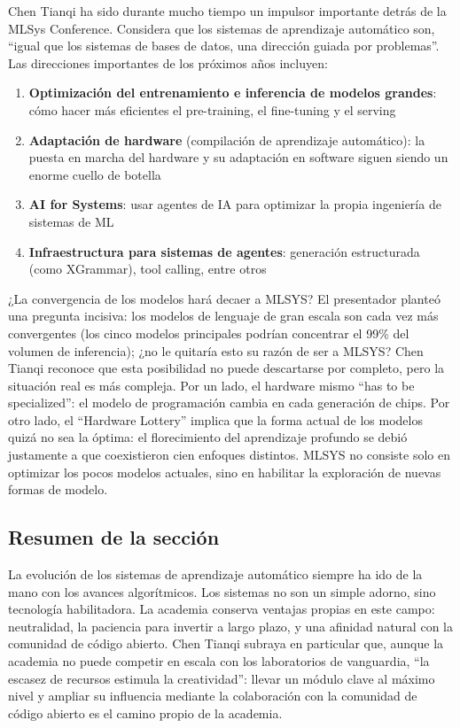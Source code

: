 \documentclass[a4paper]{article}
\begin{document}
Chen Tianqi ha sido durante mucho tiempo un impulsor importante detrás de la MLSys Conference. Considera que los sistemas de aprendizaje automático son, ``igual que los sistemas de bases de datos, una dirección guiada por problemas''. Las direcciones importantes de los próximos años incluyen:

\begin{enumerate}
    \item \textbf{Optimización del entrenamiento e inferencia de modelos grandes}: cómo hacer más eficientes el pre-training, el fine-tuning y el serving
    \item \textbf{Adaptación de hardware} (compilación de aprendizaje automático): la puesta en marcha del hardware y su adaptación en software siguen siendo un enorme cuello de botella
    \item \textbf{AI for Systems}: usar agentes de IA para optimizar la propia ingeniería de sistemas de ML
    \item \textbf{Infraestructura para sistemas de agentes}: generación estructurada (como XGrammar), tool calling, entre otros
\end{enumerate}

\begin{knowledgebox}{¿La convergencia de los modelos hará decaer a MLSYS?}
El presentador planteó una pregunta incisiva: los modelos de lenguaje de gran escala son cada vez más convergentes (los cinco modelos principales podrían concentrar el 99\% del volumen de inferencia); ¿no le quitaría esto su razón de ser a MLSYS? Chen Tianqi reconoce que esta posibilidad no puede descartarse por completo, pero la situación real es más compleja. Por un lado, el hardware mismo ``has to be specialized'': el modelo de programación cambia en cada generación de chips. Por otro lado, el ``Hardware Lottery'' implica que la forma actual de los modelos quizá no sea la óptima: el florecimiento del aprendizaje profundo se debió justamente a que coexistieron cien enfoques distintos. MLSYS no consiste solo en optimizar los pocos modelos actuales, sino en habilitar la exploración de nuevas formas de modelo.
\end{knowledgebox}

\subsection{Resumen de la sección}

La evolución de los sistemas de aprendizaje automático siempre ha ido de la mano con los avances algorítmicos. Los sistemas no son un simple adorno, sino tecnología habilitadora. La academia conserva ventajas propias en este campo: neutralidad, la paciencia para invertir a largo plazo, y una afinidad natural con la comunidad de código abierto. Chen Tianqi subraya en particular que, aunque la academia no puede competir en escala con los laboratorios de vanguardia, ``la escasez de recursos estimula la creatividad'': llevar un módulo clave al máximo nivel y ampliar su influencia mediante la colaboración con la comunidad de código abierto es el camino propio de la academia.
\end{document}
